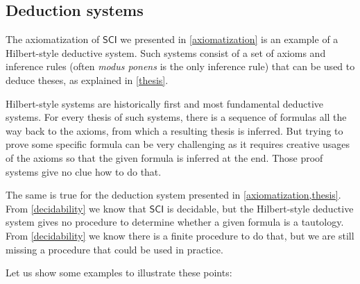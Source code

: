 \documentclass{article}
\theoremstyle{definition}
\theoremstyle{definition}
\theoremstyle{definition}
\newcommand{\SCI}{$\mathsf{SCI}$\xspace}
\begin{document}
\subsection{Deduction systems}

The axiomatization of \SCI we presented in \cref{axiomatization} is an example
of a Hilbert-style deductive system. Such systems consist of a set of axioms
and inference rules (often \emph{modus ponens} is the only inference rule) that
can be used to deduce theses, as explained in \cref{thesis}.

Hilbert-style systems are historically first and most fundamental deductive
systems. For every thesis of such systems, there is a sequence of formulas all
the way back to the axioms, from which a resulting thesis is inferred. But
trying to prove some specific formula can be very challenging as it requires
creative usages of the axioms so that the given formula is inferred at the end.
Those proof systems give no clue how to do that.

The same is true for the deduction system presented in
\cref{axiomatization,thesis}. From \cref{decidability} we know that \SCI is
decidable, but the Hilbert-style deductive system gives no procedure to
determine whether a given formula is a tautology. From \cref{decidability} we
know there is a finite procedure to do that, but we are still missing a
procedure that could be used in practice.

Let us show some examples to illustrate these points:
\end{document}
